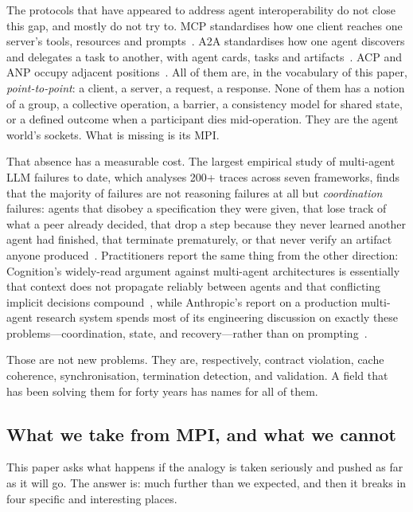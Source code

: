 The protocols that have appeared to address agent interoperability do not
close this gap, and mostly do not try to. MCP standardises how one client
reaches one server's tools, resources and
prompts~\cite{mcpblog2026}. A2A standardises how one agent discovers and
delegates a task to another, with agent cards, tasks and
artifacts~\cite{a2adocs2026v1}. ACP and ANP occupy adjacent
positions~\cite{ibm2026acp,ehtesham2025survey}. All of them are, in the vocabulary of
this paper, \emph{point-to-point}: a client, a server, a request, a
response. None of them has a notion of a group, a collective operation, a
barrier, a consistency model for shared state, or a defined outcome when a
participant dies mid-operation. They are the agent world's sockets. What is
missing is its MPI.

That absence has a measurable cost. The largest empirical study of
multi-agent LLM failures to date, which analyses 200+ traces across seven
frameworks, finds that the majority of failures are not reasoning failures
at all but \emph{coordination} failures: agents that disobey a specification
they were given, that lose track of what a peer already decided, that drop a
step because they never learned another agent had finished, that terminate
prematurely, or that never verify an artifact anyone
produced~\cite{cemri2025mast}. Practitioners report the same thing from the
other direction: Cognition's widely-read argument against multi-agent
architectures is essentially that context does not propagate reliably
between agents and that conflicting implicit decisions
compound~\cite{yan2025dontbuild}, while Anthropic's report on a
production multi-agent research system spends most of its engineering
discussion on exactly these problems---coordination, state, and
recovery---rather than on prompting~\cite{anthropic2025multiagent}.

Those are not new problems. They are, respectively, contract violation,
cache coherence, synchronisation, termination detection, and validation. A
field that has been solving them for forty years has names for all of them.

\subsection{What we take from MPI, and what we cannot}

This paper asks what happens if the analogy is taken seriously and pushed as
far as it will go. The answer is: much further than we expected, and then it
breaks in four specific and interesting places.

